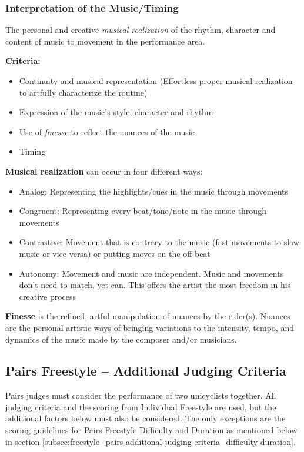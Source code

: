 \subsubsection{Interpretation of the Music/Timing}

The personal and creative \emph{musical realization} of the rhythm, character and content of music to movement in the performance area.

\textbf{Criteria:}
\begin{itemize}
\item Continuity and musical representation (Effortless proper musical realization to artfully characterize the routine)
\item Expression of the music's style, character and rhythm
\item Use of \emph{finesse} to reflect the nuances of the music
\item Timing
\end{itemize}

\textbf{Musical realization} can occur in four different ways:
\begin{itemize}
\item Analog: Representing the highlights/cues in the music through movements
\item Congruent: Representing every beat/tone/note in the music through movements
\item Contrastive: Movement that is contrary to the music (fast movements to slow music or vice versa) or putting moves on the off-beat
\item Autonomy: Movement and music are independent. Music and movements don't need to match, yet can. This offers the artist the most freedom in his creative process
\end{itemize}

\textbf{Finesse} is the refined, artful manipulation of nuances by the rider(s). Nuances are the personal artistic ways of bringing variations to the intensity, tempo, and dynamics of the music made by the composer and/or musicians.

\subsection{Pairs Freestyle -- Additional Judging Criteria}

Pairs judges must consider the performance of two unicyclists together.
All judging criteria and the scoring from Individual Freestyle are used, but the additional factors below must also be considered.
The only exceptions are the scoring guidelines for Pairs Freestyle Difficulty and Duration as mentioned below in section \ref{subsec:freestyle_pairs-additional-judging-criteria_difficulty-duration}.

